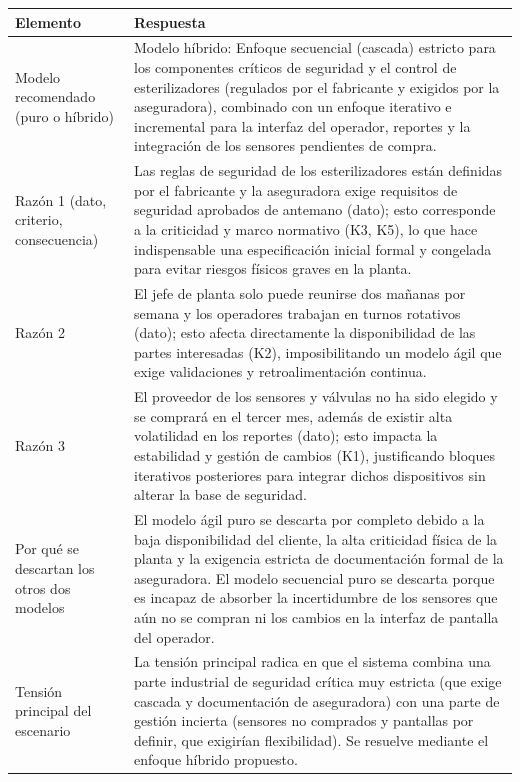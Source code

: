 \documentclass[11pt,a4paper]{article}
\begin{document}
	\begin{tabularx}{\textwidth}{|p{4.5cm}|Y|}
	\hline
	\textbf{Elemento} & \textbf{Respuesta} \\ \hline
	
	Modelo recomendado (puro o híbrido) &
	Modelo híbrido: Enfoque secuencial (cascada) estricto para los componentes críticos de seguridad y el control de esterilizadores (regulados por el fabricante y exigidos por la aseguradora), combinado con un enfoque iterativo e incremental para la interfaz del operador, reportes y la integración de los sensores pendientes de compra. \\ \hline
	
	Razón 1 (dato, criterio, consecuencia) &
	Las reglas de seguridad de los esterilizadores están definidas por el fabricante y la aseguradora exige requisitos de seguridad aprobados de antemano (dato); esto corresponde a la criticidad y marco normativo (K3, K5), lo que hace indispensable una especificación inicial formal y congelada para evitar riesgos físicos graves en la planta. \\ \hline
	
	Razón 2 &
	El jefe de planta solo puede reunirse dos mañanas por semana y los operadores trabajan en turnos rotativos (dato); esto afecta directamente la disponibilidad de las partes interesadas (K2), imposibilitando un modelo ágil que exige validaciones y retroalimentación continua. \\ \hline
	
	Razón 3 &
	El proveedor de los sensores y válvulas no ha sido elegido y se comprará en el tercer mes, además de existir alta volatilidad en los reportes (dato); esto impacta la estabilidad y gestión de cambios (K1), justificando bloques iterativos posteriores para integrar dichos dispositivos sin alterar la base de seguridad. \\ \hline
	
	Por qué se descartan los otros dos modelos &
	El modelo ágil puro se descarta por completo debido a la baja disponibilidad del cliente, la alta criticidad física de la planta y la exigencia estricta de documentación formal de la aseguradora. El modelo secuencial puro se descarta porque es incapaz de absorber la incertidumbre de los sensores que aún no se compran ni los cambios en la interfaz de pantalla del operador. \\ \hline
	
	Tensión principal del escenario &
	La tensión principal radica en que el sistema combina una parte industrial de seguridad crítica muy estricta (que exige cascada y documentación de aseguradora) con una parte de gestión incierta (sensores no comprados y pantallas por definir, que exigirían flexibilidad). Se resuelve mediante el enfoque híbrido propuesto. \\ \hline
\end{tabularx}
	
\end{document}
